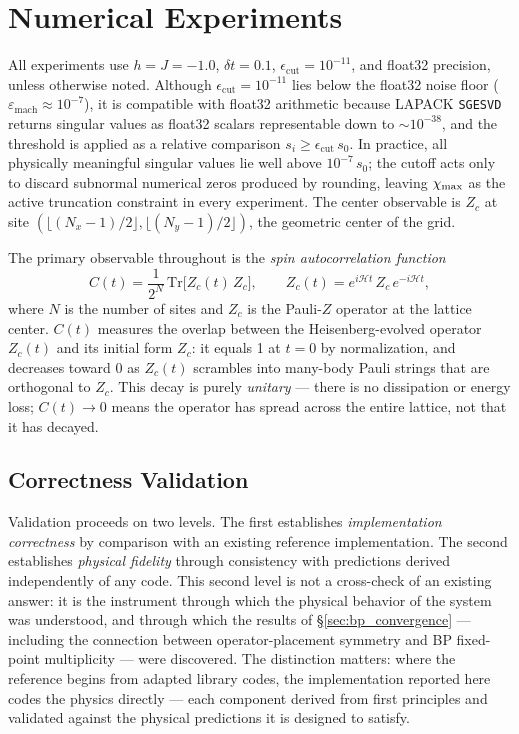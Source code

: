 \section{Numerical Experiments}
\label{sec:experiments}

All experiments use $h = J = -1.0$, $\delta t = 0.1$,
$\epsilon_{\mathrm{cut}} = 10^{-11}$, and float32 precision,
unless otherwise noted.
Although $\epsilon_{\mathrm{cut}} = 10^{-11}$ lies below the float32 noise
floor ($\varepsilon_{\mathrm{mach}} \approx 10^{-7}$), it is compatible with
float32 arithmetic because LAPACK \texttt{SGESVD} returns singular values
as float32 scalars representable down to $\sim10^{-38}$, and the threshold is
applied as a relative comparison $s_i \geq \epsilon_{\mathrm{cut}}\,s_0$.
In practice, all physically meaningful singular values lie well above
$10^{-7}\,s_0$; the cutoff acts only to discard subnormal numerical zeros
produced by rounding, leaving $\chi_{\mathrm{max}}$ as the active truncation constraint
in every experiment.
The center observable is $Z_c$ at site $(\lfloor(N_x-1)/2\rfloor,\lfloor(N_y-1)/2\rfloor)$,
the geometric center of the grid.

The primary observable throughout is the \emph{spin autocorrelation function}
\begin{equation}
 C(t) = \frac{1}{2^N}\,\mathrm{Tr}\bigl[Z_c(t)\,Z_c\bigr],
 \qquad
 Z_c(t) = e^{i\mathcal{H}t}\,Z_c\,e^{-i\mathcal{H}t},
 \label{eq:ct_def}
\end{equation}
where $N$ is the number of sites and $Z_c$ is the Pauli-$Z$ operator at the
lattice center.
$C(t)$ measures the overlap between the Heisenberg-evolved operator $Z_c(t)$
and its initial form $Z_c$: it equals 1 at $t=0$ by normalization, and
decreases toward 0 as $Z_c(t)$ scrambles into many-body Pauli strings
that are orthogonal to $Z_c$.
This decay is purely \emph{unitary} --- there is no dissipation or energy loss;
$C(t) \to 0$ means the operator has spread across the entire lattice,
not that it has decayed.

\subsection{Correctness Validation}
\label{sec:correctness}

Validation proceeds on two levels.
The first establishes \emph{implementation correctness} by comparison with an
existing reference implementation.
The second establishes \emph{physical fidelity} through consistency with
predictions derived independently of any code.
This second level is not a cross-check of an existing answer: it is the
instrument through which the physical behavior of the system was understood,
and through which the results of \S\ref{sec:bp_convergence} --- including the
connection between operator-placement symmetry and BP fixed-point multiplicity
--- were discovered.
The distinction matters: where the reference begins from adapted library codes,
the implementation reported here codes the physics directly --- each component
derived from first principles and validated against the physical predictions it
is designed to satisfy.

